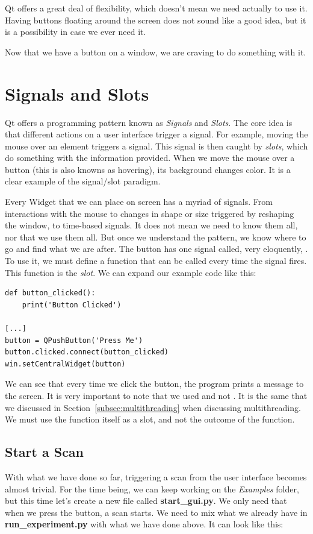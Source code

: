Qt offers a great deal of flexibility, which doesn't mean we need actually to use it. Having buttons floating around the screen does not sound like a good idea, but it is a possibility in case we ever need it.

Now that we have a button on a window, we are craving to do something with it.


\section{Signals and Slots}\label{sec:signals-slots}
Qt offers a programming pattern known as \emph{Signals} and \emph{Slots}. The core idea is that different actions on a user interface trigger a signal. For example, moving the mouse over an element triggers a signal. This signal is then caught by \emph{slots}, which do something with the information provided. When we move the mouse over a button (this is also knowns as hovering), its background changes color. It is a clear example of the signal/slot paradigm.

Every Widget that we can place on screen has a myriad of signals. From interactions with the mouse to changes in shape or size triggered by reshaping the window, to time-based signals. It does not mean we need to know them all, nor that we use them all. But once we understand the pattern, we know where to go and find what we are after. The button has one signal called, very eloquently, . To use it, we must define a function that can be called every time the signal fires. This function is the \emph{slot}. We can expand our example code like this:

\begin{verbatim}
def button_clicked():
    print('Button Clicked')

[...]
button = QPushButton('Press Me')
button.clicked.connect(button_clicked)
win.setCentralWidget(button)
\end{verbatim}

We can see that every time we click the button, the program prints a message to the screen. It is very important to note that we used  and not . It is the same that we discussed in Section~\ref{subsec:multithreading} when discussing multithreading. We must use the function itself as a slot, and not the outcome of the function.

\subsection{Start a Scan}\label{subsec:start-scan-gui}
With what we have done so far, triggering a scan from the user interface becomes almost trivial. For the time being, we can keep working on the \emph{Examples} folder, but this time let's create a new file called \textbf{start\_gui.py}. We only need that when we press the button, a scan starts. We need to mix what we already have in \textbf{run\_experiment.py} with what we have done above. It can look like this:

